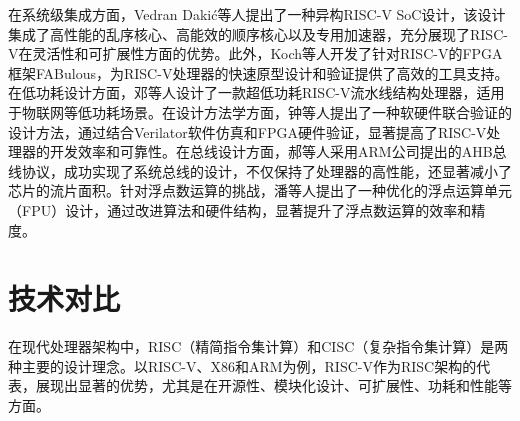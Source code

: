 在系统级集成方面，Vedran Dakić等人提出了一种异构RISC-V SoC设计，该设计集成了高性能的乱序核心、高能效的顺序核心以及专用加速器，充分展现了RISC-V在灵活性和可扩展性方面的优势\cite{electronics13173494}。此外，Koch等人开发了针对RISC-V的FPGA框架FABulous，为RISC-V处理器的快速原型设计和验证提供了高效的工具支持\cite{10.1145/3431920}。在低功耗设计方面，邓等人设计了一款超低功耗RISC-V流水线结构处理器，适用于物联网等低功耗场景\cite{DZJY201906011}。在设计方法学方面，钟等人提出了一种软硬件联合验证的设计方法，通过结合Verilator软件仿真和FPGA硬件验证，显著提高了RISC-V处理器的开发效率和可靠性\cite{SDDZ202411008}。在总线设计方面，郝等人采用ARM公司提出的AHB总线协议，成功实现了系统总线的设计，不仅保持了处理器的高性能，还显著减小了芯片的流片面积\cite{JSGG202020007}。针对浮点数运算的挑战，潘等人提出了一种优化的浮点运算单元（FPU）设计，通过改进算法和硬件结构，显著提升了浮点数运算的效率和精度\cite{JSGG202103009}。

\section{技术对比}
在现代处理器架构中，RISC（精简指令集计算）和CISC（复杂指令集计算）是两种主要的设计理念。以RISC-V、X86和ARM为例，RISC-V作为RISC架构的代表，展现出显著的优势，尤其是在开源性、模块化设计、可扩展性、功耗和性能等方面。

